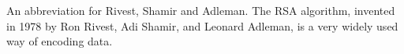 An abbreviation for Rivest, Shamir and Adleman. The RSA algorithm,
invented in 1978 by Ron Rivest, Adi Shamir, and Leonard Adleman,
is a very widely used way of encoding data.
